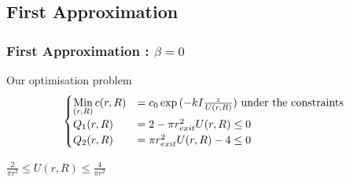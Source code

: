 \documentclass[xcolor=dvipsnames,10pt]{beamer}
\begin{document}
  \subsection{First Approximation}
  \begin{frame}
  \frametitle{First Approximation : $\beta = 0$}
  \begin{block}{Our optimisation problem}
$$ 
\begin{cases}
\mathop{\rm Min}\limits _{(r,R)} c(r,R) & = c_0 \exp{(-kI\frac{z}{U(r,R)})} \textrm{ under the constraints} \\
Q_1(r,R) & = 2-\pi r_{exit}^2U(r,R) \leq 0 \\
Q_2(r,R) & = \pi r_{exit}^2U(r,R) - 4 \leq 0
\end{cases}
$$
  \end{block}

\hspace{0.2cm}
\begin{minipage}{5cm}
$\frac{2}{\pi r^2} \leq U(r,R) \leq \frac{4}{\pi r^2}$
\end{minipage}
  \end{frame}
\end{document}
